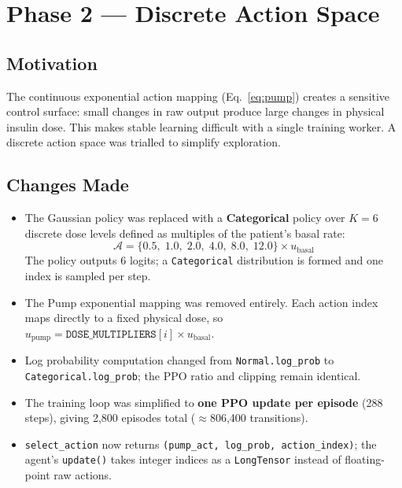 \documentclass[11pt,a4paper]{article}
\begin{document}
\section{Phase 2 — Discrete Action Space}

\subsection{Motivation}
The continuous exponential action mapping (Eq.~\ref{eq:pump}) creates a sensitive control
surface: small changes in raw output produce large changes in physical insulin dose. This
makes stable learning difficult with a single training worker. A discrete action space
was trialled to simplify exploration.

\subsection{Changes Made}
\begin{itemize}
    \item The Gaussian policy was replaced with a \textbf{Categorical} policy over
          $K = 6$ discrete dose levels defined as multiples of the patient's basal rate:
          \begin{equation}
              \mathcal{A} = \{0.5,\; 1.0,\; 2.0,\; 4.0,\; 8.0,\; 12.0\} \times u_\text{basal}
          \end{equation}
          The policy outputs 6 logits; a \texttt{Categorical} distribution is formed and
          one index is sampled per step.
    \item The Pump exponential mapping was removed entirely. Each action index maps
          directly to a fixed physical dose, so $u_\text{pump} = \texttt{DOSE\_MULTIPLIERS}[i]
          \times u_\text{basal}$.
    \item Log probability computation changed from \texttt{Normal.log\_prob} to
          \texttt{Categorical.log\_prob}; the PPO ratio and clipping remain identical.
    \item The training loop was simplified to \textbf{one PPO update per episode}
          (288 steps), giving 2,800 episodes total ($\approx$806,400 transitions).
    \item \texttt{select\_action} now returns \texttt{(pump\_act, log\_prob, action\_index)};
          the agent's \texttt{update()} takes integer indices as a \texttt{LongTensor}
          instead of floating-point raw actions.
\end{itemize}
\end{document}
